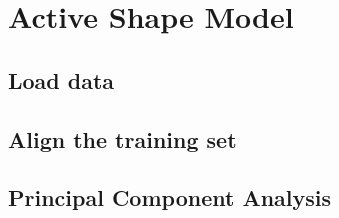 \section{Active Shape Model}

\subsection{Load data}

\subsection{Align the training set}

\subsection{Principal Component Analysis}
